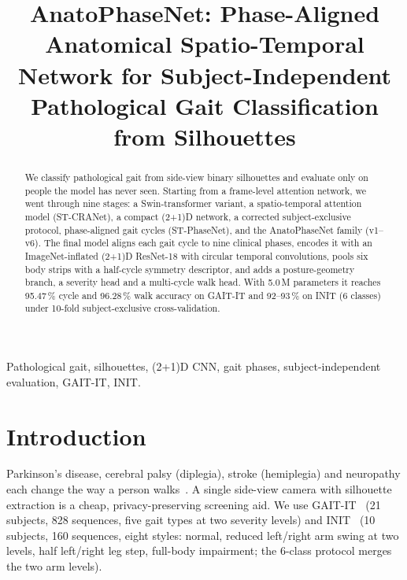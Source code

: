 \documentclass[conference]{IEEEtran}
\begin{document}
\title{AnatoPhaseNet: Phase-Aligned Anatomical Spatio-Temporal Network for
Subject-Independent Pathological Gait Classification from Silhouettes}

\author{
}

\maketitle

\begin{abstract}
We classify pathological gait from side-view binary silhouettes and evaluate
only on people the model has never seen. Starting from a frame-level attention
network, we went through nine stages: a Swin-transformer variant, a
spatio-temporal attention model (ST-CRANet), a compact (2+1)D network, a corrected
subject-exclusive protocol, phase-aligned gait cycles (ST-PhaseNet), and the
AnatoPhaseNet family (v1--v6). The final model aligns each gait cycle to nine
clinical phases, encodes it with an ImageNet-inflated (2+1)D ResNet-18 with
circular temporal convolutions, pools six body strips with a half-cycle symmetry
descriptor, and adds a posture-geometry branch, a severity head and a
multi-cycle walk head. With 5.0\,M parameters it reaches 95.47\,\% cycle and
96.28\,\% walk accuracy on GAIT-IT and 92--93\,\% on INIT (6 classes) under
10-fold subject-exclusive cross-validation.
\end{abstract}

\begin{IEEEkeywords}
Pathological gait, silhouettes, (2+1)D CNN, gait phases, subject-independent
evaluation, GAIT-IT, INIT.
\end{IEEEkeywords}

\section{Introduction}
Parkinson's disease, cerebral palsy (diplegia), stroke (hemiplegia) and
neuropathy each change the way a person walks~\cite{baker2018}. A single
side-view camera with silhouette extraction is a cheap, privacy-preserving
screening aid. We use GAIT-IT~\cite{albuquerque2021} (21 subjects, 828
sequences, five gait types at two severity levels) and INIT~\cite{ortells2018}
(10 subjects, 160 sequences, eight styles: normal, reduced left/right arm swing
at two levels, half left/right leg step, full-body impairment; the 6-class
protocol merges the two arm levels).
\end{document}
